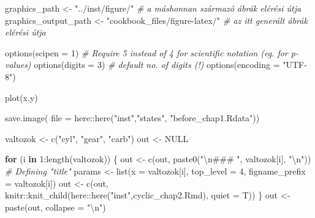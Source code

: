 \documentclass[]{elsarticle} %
\newenvironment{Shaded}{\begin{snugshade}}{\end{snugshade}}
\newcommand{\AttributeTok}[1]{\textcolor[rgb]{0.77,0.63,0.00}{#1}}
\newcommand{\CommentTok}[1]{\textcolor[rgb]{0.56,0.35,0.01}{\textit{#1}}}
\newcommand{\ConstantTok}[1]{\textcolor[rgb]{0.00,0.00,0.00}{#1}}
\newcommand{\ControlFlowTok}[1]{\textcolor[rgb]{0.13,0.29,0.53}{\textbf{#1}}}
\newcommand{\DecValTok}[1]{\textcolor[rgb]{0.00,0.00,0.81}{#1}}
\newcommand{\FunctionTok}[1]{\textcolor[rgb]{0.00,0.00,0.00}{#1}}
\newcommand{\NormalTok}[1]{#1}
\newcommand{\OtherTok}[1]{\textcolor[rgb]{0.56,0.35,0.01}{#1}}
\newcommand{\SpecialCharTok}[1]{\textcolor[rgb]{0.00,0.00,0.00}{#1}}
\newcommand{\StringTok}[1]{\textcolor[rgb]{0.31,0.60,0.02}{#1}}
\begin{document}
\begin{Shaded}
\begin{Highlighting}[]
\NormalTok{graphics\_path }\OtherTok{\textless{}{-}} \StringTok{"../inst/figure/"}            \CommentTok{\# a máshonnan származó ábrák elérési útja}
\NormalTok{graphics\_output\_path }\OtherTok{\textless{}{-}} \StringTok{"cookbook\_files/figure{-}latex/"} \CommentTok{\# az itt generált ábrák elérési útja}

\FunctionTok{options}\NormalTok{(}\AttributeTok{scipen =} \DecValTok{1}\NormalTok{) }\CommentTok{\# Require 5 instead of 4 for scientific notation (eg. for p{-}values)}
\FunctionTok{options}\NormalTok{(}\AttributeTok{digits =} \DecValTok{3}\NormalTok{) }\CommentTok{\# default no. of digits (!) }
\FunctionTok{options}\NormalTok{(}\AttributeTok{encoding =} \StringTok{"UTF{-}8"}\NormalTok{) }

\FunctionTok{plot}\NormalTok{(x,y)}

\FunctionTok{save.image}\NormalTok{( }\AttributeTok{file =}\NormalTok{ here}\SpecialCharTok{::}\FunctionTok{here}\NormalTok{(}\StringTok{"inst"}\NormalTok{,}\StringTok{"states"}\NormalTok{, }\StringTok{"before\_chap1.Rdata"}\NormalTok{))}

\NormalTok{valtozok }\OtherTok{\textless{}{-}} \FunctionTok{c}\NormalTok{(}\StringTok{"cyl"}\NormalTok{, }\StringTok{"gear"}\NormalTok{, }\StringTok{"carb"}\NormalTok{)}
\NormalTok{out }\OtherTok{\textless{}{-}} \ConstantTok{NULL}

\ControlFlowTok{for}\NormalTok{ (i }\ControlFlowTok{in} \DecValTok{1}\SpecialCharTok{:}\FunctionTok{length}\NormalTok{(valtozok)) \{}
\NormalTok{  out }\OtherTok{\textless{}{-}} \FunctionTok{c}\NormalTok{(out, }\FunctionTok{paste0}\NormalTok{(}\StringTok{"}\SpecialCharTok{\textbackslash{}n}\StringTok{\#\#\# "}\NormalTok{, valtozok[i], }\StringTok{"}\SpecialCharTok{\textbackslash{}n}\StringTok{"}\NormalTok{)) }\CommentTok{\# Defining "title"}
\NormalTok{  params }\OtherTok{\textless{}{-}} \FunctionTok{list}\NormalTok{(}\AttributeTok{x              =}\NormalTok{ valtozok[i],}
                 \AttributeTok{top\_level      =} \DecValTok{4}\NormalTok{,}
                 \AttributeTok{figname\_prefix =}\NormalTok{ valtozok[i])}
\NormalTok{  out }\OtherTok{\textless{}{-}} \FunctionTok{c}\NormalTok{(out,}
\NormalTok{           knitr}\SpecialCharTok{::}\FunctionTok{knit\_child}\NormalTok{(here}\SpecialCharTok{::}\FunctionTok{here}\NormalTok{(}\StringTok{"inst"}\NormalTok{,}\StringTok{\textquotesingle{}cyclic\_chap2.Rmd\textquotesingle{}}\NormalTok{),}
                             \AttributeTok{quiet =}\NormalTok{ T))}
\NormalTok{\}}
\NormalTok{out }\OtherTok{\textless{}{-}} \FunctionTok{paste}\NormalTok{(out, }\AttributeTok{collapse =} \StringTok{"}\SpecialCharTok{\textbackslash{}n}\StringTok{"}\NormalTok{)}


\end{Highlighting}
\end{Shaded}
\end{document}
